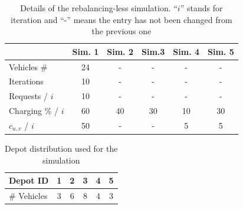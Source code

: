 \begin{table}[h]
		\centering
		\begin{tabular}{ |l| c|c|c|c|c|}
			\hline
			&Sim. 1 & Sim. 2& Sim.3&Sim. 4&Sim. 5 \\
			\hline
			Vehicles \#& 24&-&- &-&-\\
			Iterations & 10&-&-&-&-\\
			Requests / $i$ & 10&-&-&-&-\\
			Charging \% / $i$ & 60&40&30&10&30\\
			$c_{u,v}$ / $i$ & 50&-&-&5&5\\
		\end{tabular}
		\caption[Details of the rebalancing-less simulation]{Details of the rebalancing-less simulation. ``$i$'' stands for iteration and ``-'' means the entry has not been changed from the previous one}
		\label{tab:routingless_simu_details}  
\end{table} 
	\begin{table}[h]
	\centering
	\begin{tabular}{ | p{2cm} | c | c | c | c |c|}
		\hline
		Depot ID & 1 & 2 & 3 & 4 & 5\\
		\hline
		\# Vehicles & 3 & 6 & 8 & 4 & 3\\
	\end{tabular}
	\caption{Depot distribution used for the simulation}
	\label{tab:routingless_depot_distribution}  
\end{table}



